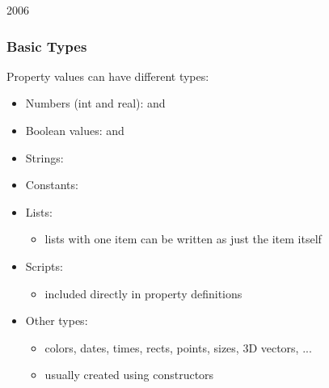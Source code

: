 \begin{slide}{2006}\frametitle{Basic Types}
Property values can have different types:
\begin{itemize}
\item Numbers (int and real):  and 
\item Boolean values:  and 
\item Strings: 
\item Constants: 
\vspace*{0.25em}
\item Lists: 
  \begin{itemize}
  \item lists with one item can be written as just the item itself
  \end{itemize}
  \vspace*{0.25em}
\item Scripts:
  \begin{itemize}
  \item included directly in property definitions
  \end{itemize}
  \vspace*{0.25em}
\item Other types:
  \begin{itemize}
  \item colors, dates, times, rects, points, sizes, 3D vectors, ...
  \item usually created using constructors
  \end{itemize}
\end{itemize}


\end{slide}


